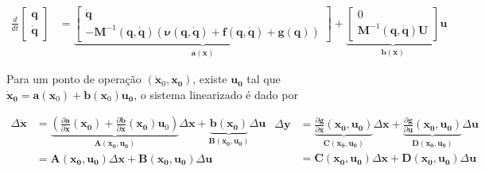 \documentclass[a4paper, twoside, fleqn]{article}
\begin{document}
    \begin{equation}
    \label{eq:states}
        \begin{aligned}
            \frac{d}{dt} \begin{bmatrix} \mathbf{q} \\ \mathbf{\dot q} \end{bmatrix} &= 
            \underbrace{\begin{bmatrix}
                \mathbf{\dot q} \\
                - \mathbf{M}^{-1}(\mathbf{q}, \mathbf{\dot q})(\mathbf{\nu}(\mathbf{q}, \mathbf{\dot q}) + \mathbf{f}(\mathbf{q}, \mathbf{\dot q}) + \mathbf{g}(\mathbf{q}) )
            \end{bmatrix}}_{\mathbf{a}(\mathbf{x})} + 
            \underbrace{\begin{bmatrix} 
                0 \\ \mathbf{M}^{-1}(\mathbf{q}, \mathbf{\dot q}) \mathbf{U} 
            \end{bmatrix}}_{\mathbf{b}(\mathbf{x})} \mathbf{u}
        \end{aligned}
    \end{equation}
    
    Para um ponto de operação $(\mathbf{\dot x}_0, \mathbf{x_0})$, existe $\mathbf{u_0}$ tal que $\mathbf{\dot x_0} = \mathbf{a}(\mathbf{x}_0) + \mathbf{b}(\mathbf{x}_0) \mathbf{u_0}$, o sistema linearizado é dado por 
    
    \begin{subequations}
        \begin{equation}
            \begin{aligned}
                \Delta \mathbf{\dot x} &= \underbrace{(\frac{\partial \mathbf{a}}{\partial \mathbf{x}}(\mathbf{x_0}) + \frac{\partial \mathbf{b}}{\partial \mathbf{x}}(\mathbf{x_0}) \mathbf{u}_0)}_{\mathbf{A}(\mathbf{x_0}, \mathbf{u_0})} \Delta \mathbf{x} + \underbrace{ \mathbf{b}(\mathbf{x_0}) }_{\mathbf{B}(\mathbf{x_0}, \mathbf{u_0})} \Delta \mathbf{u} \\
                & = \mathbf{A}(\mathbf{x_0}, \mathbf{u_0}) \Delta \mathbf{x} + \mathbf{B}(\mathbf{x_0}, \mathbf{u_0}) \Delta \mathbf{u}
            \end{aligned}
        \end{equation}
        \begin{equation}
            \begin{aligned}
                \Delta \mathbf{y} &= \underbrace{\frac{\partial \mathbf{g}}{\partial \mathbf{x}}(\mathbf{x_0}, \mathbf{u_0})}_{\mathbf{C}(\mathbf{x_0}, \mathbf{u_0})} \Delta \mathbf{x} + \underbrace{\frac{\partial \mathbf{g}}{\partial \mathbf{u}}(\mathbf{x_0}, \mathbf{u_0})}_{\mathbf{D}(\mathbf{x_0}, \mathbf{u_0})} \Delta \mathbf{u} \\
                & = \mathbf{C}(\mathbf{x_0}, \mathbf{u_0}) \Delta \mathbf{x} + \mathbf{D}(\mathbf{x_0}, \mathbf{u_0}) \Delta \mathbf{u}
            \end{aligned}
        \end{equation}    
    \end{subequations}
    
\end{document}
